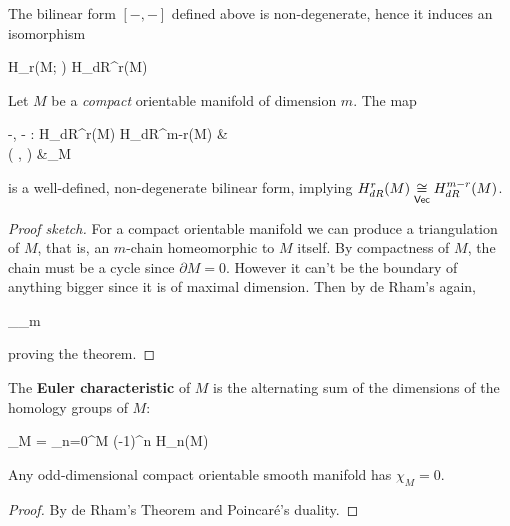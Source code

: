\documentclass[main.tex]{subfiles}
\begin{document}
\begin{theorem}[de Rham]
\label{th:de_rham}
	The bilinear form $[-,-]$ defined above is non-degenerate, hence it induces an isomorphism
	\begin{eqalign}
		H_r(M; \R) \isoin{\Vec} H_{dR}^r(M)
	\end{eqalign}
\end{theorem}

\begin{theorem}
	Let $M$ be a \emph{compact} orientable manifold of dimension $m$. The map
	\begin{eqalign}
		\langle -, - \rangle : H_{dR}^r(M) \times H_{dR}^{m-r}(M) &\longto \R\\
		( \overline \omega, \overline \eta) &\longmapsto \int_M \omega \wedge \eta
	\end{eqalign}
	is a well-defined, non-degenerate bilinear form, implying $H_{dR}^r(M) \isoin\Vec H_{dR}^{m-r}(M)$.
\end{theorem}
\begin{proof}[Proof sketch]
	For a compact orientable manifold we can produce a triangulation of $M$, that is, an $m$-chain homeomorphic to $M$ itself. By compactness of $M$, the chain must be a cycle since $\partial M = 0$. However it can't be the boundary of anything bigger since it is of maximal dimension. Then by de Rham's again,
	\begin{eqalign}
		\int_{\Delta_m} \omega \wedge \eta \neq 0
	\end{eqalign}
	proving the theorem.
\end{proof}

\begin{definition}
	The \textbf{Euler characteristic} of $M$ is the alternating sum of the dimensions of the homology groups of $M$:
	\begin{eqalign}
		\chi_M = \sum_{n=0}^{\dim M} (-1)^n \dim H_n(M)
	\end{eqalign}
\end{definition}

\begin{corollary}
	Any odd-dimensional compact orientable smooth manifold has $\chi_M = 0$.
\end{corollary}
\begin{proof}
	By de Rham's Theorem and Poincaré's duality.
\end{proof}
\end{document}
